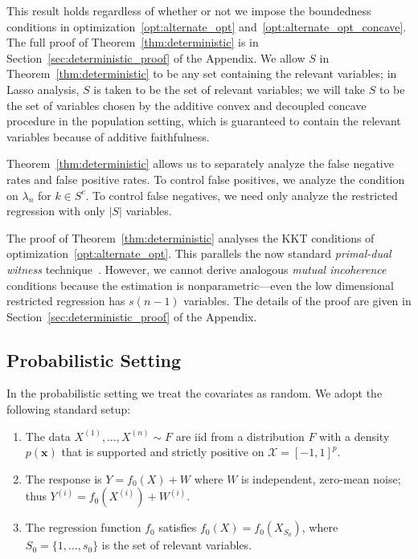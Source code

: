 This result holds regardless of whether or not we impose the boundedness conditions in optimization~\eqref{opt:alternate_opt} and~\eqref{opt:alternate_opt_concave}.
The full proof of Theorem~\ref{thm:deterministic} is in Section~\ref{sec:deterministic_proof} of the Appendix. We allow $S$ in Theorem~\ref{thm:deterministic} to be any set containing the relevant variables; in Lasso analysis, $S$ is taken to be the set of relevant variables; we will take $S$ to be the set of variables chosen by the additive convex and decoupled concave procedure in the population setting, which is guaranteed to contain the relevant variables because of additive faithfulness.

Theorem~\ref{thm:deterministic} allows us to separately analyze the false negative
rates and false positive rates. To control false positives,
we analyze the condition on $\lambda_n$ for $k \in S^c$. To control
false negatives, we need only analyze the restricted regression with only $|S|$ variables.

The proof of Theorem~\ref{thm:deterministic} analyses the KKT
conditions of optimization~\eqref{opt:alternate_opt}.  This parallels
the now standard \emph{primal-dual witness}
technique~\citep{wainwright2009sharp}. However, we cannot derive analogous
\emph{mutual incoherence} conditions because the estimation is
nonparametric---even the low dimensional restricted regression has
$s(n-1)$ variables. The details of the proof are given in
Section~\ref{sec:deterministic_proof} of the Appendix.

\subsection{Probabilistic Setting}

In the probabilistic setting we treat the covariates as random.  We
adopt the following standard setup:

\begin{enumerate}
\item The data $X^{(1)},\ldots, X^{(n)} \sim F$ are iid from
a distribution $F$ with a density $p(\mathbf{x})$ that is supported and strictly positive on $\mathcal{X}=[-1,1]^p$.
\item The response is $Y = f_0(X) + W$ where $W$ is
  independent, zero-mean noise; thus $Y^{(i)} = f_0(X^{(i)}) + W^{(i)}$.
\item The regression function $f_0$ satisfies
$f_0(X) = f_0(X_{S_0})$, where $S_0 = \{1,\ldots,s_0\}$ is the set of
relevant variables.
\end{enumerate}



